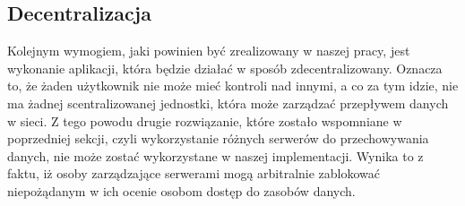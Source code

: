 \subsection{Decentralizacja}
\label{sec:Decentralizacja}
Kolejnym wymogiem, jaki powinien być zrealizowany w naszej pracy, jest wykonanie aplikacji, która będzie działać w sposób zdecentralizowany. Oznacza to, że żaden użytkownik nie może mieć kontroli nad innymi, a co za tym idzie, nie ma żadnej scentralizowanej jednostki, która może zarządzać przepływem danych w sieci. Z tego powodu drugie rozwiązanie, które zostało wspomniane w poprzedniej sekcji, czyli wykorzystanie różnych serwerów do przechowywania danych, nie może zostać wykorzystane w naszej implementacji. Wynika to z faktu, iż osoby zarządzające serwerami mogą arbitralnie zablokować niepożądanym w ich ocenie osobom dostęp do zasobów danych.


